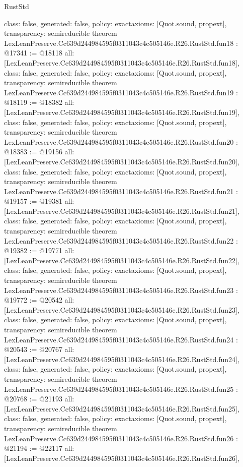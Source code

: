 \begin{lexlean}{RustStd}
\begin{coremodule}
{  class: false,
  generated: false,
  policy: exact{axioms: [Quot.sound, propext]},
  transparency: semireducible
}
theorem LexLeanPreserve.Cc639d244984595f0311043c4c505146e.R26.RustStd.fun18 : @17341 := @18118 {
  all: [LexLeanPreserve.Cc639d244984595f0311043c4c505146e.R26.RustStd.fun18],
  class: false,
  generated: false,
  policy: exact{axioms: [Quot.sound, propext]},
  transparency: semireducible
}
theorem LexLeanPreserve.Cc639d244984595f0311043c4c505146e.R26.RustStd.fun19 : @18119 := @18382 {
  all: [LexLeanPreserve.Cc639d244984595f0311043c4c505146e.R26.RustStd.fun19],
  class: false,
  generated: false,
  policy: exact{axioms: [Quot.sound, propext]},
  transparency: semireducible
}
theorem LexLeanPreserve.Cc639d244984595f0311043c4c505146e.R26.RustStd.fun20 : @18383 := @19156 {
  all: [LexLeanPreserve.Cc639d244984595f0311043c4c505146e.R26.RustStd.fun20],
  class: false,
  generated: false,
  policy: exact{axioms: [Quot.sound, propext]},
  transparency: semireducible
}
theorem LexLeanPreserve.Cc639d244984595f0311043c4c505146e.R26.RustStd.fun21 : @19157 := @19381 {
  all: [LexLeanPreserve.Cc639d244984595f0311043c4c505146e.R26.RustStd.fun21],
  class: false,
  generated: false,
  policy: exact{axioms: [Quot.sound, propext]},
  transparency: semireducible
}
theorem LexLeanPreserve.Cc639d244984595f0311043c4c505146e.R26.RustStd.fun22 : @19382 := @19771 {
  all: [LexLeanPreserve.Cc639d244984595f0311043c4c505146e.R26.RustStd.fun22],
  class: false,
  generated: false,
  policy: exact{axioms: [Quot.sound, propext]},
  transparency: semireducible
}
theorem LexLeanPreserve.Cc639d244984595f0311043c4c505146e.R26.RustStd.fun23 : @19772 := @20542 {
  all: [LexLeanPreserve.Cc639d244984595f0311043c4c505146e.R26.RustStd.fun23],
  class: false,
  generated: false,
  policy: exact{axioms: [Quot.sound, propext]},
  transparency: semireducible
}
theorem LexLeanPreserve.Cc639d244984595f0311043c4c505146e.R26.RustStd.fun24 : @20543 := @20767 {
  all: [LexLeanPreserve.Cc639d244984595f0311043c4c505146e.R26.RustStd.fun24],
  class: false,
  generated: false,
  policy: exact{axioms: [Quot.sound, propext]},
  transparency: semireducible
}
theorem LexLeanPreserve.Cc639d244984595f0311043c4c505146e.R26.RustStd.fun25 : @20768 := @21193 {
  all: [LexLeanPreserve.Cc639d244984595f0311043c4c505146e.R26.RustStd.fun25],
  class: false,
  generated: false,
  policy: exact{axioms: [Quot.sound, propext]},
  transparency: semireducible
}
theorem LexLeanPreserve.Cc639d244984595f0311043c4c505146e.R26.RustStd.fun26 : @21194 := @22117 {
  all: [LexLeanPreserve.Cc639d244984595f0311043c4c505146e.R26.RustStd.fun26],
}
\end{coremodule}
\end{lexlean}
